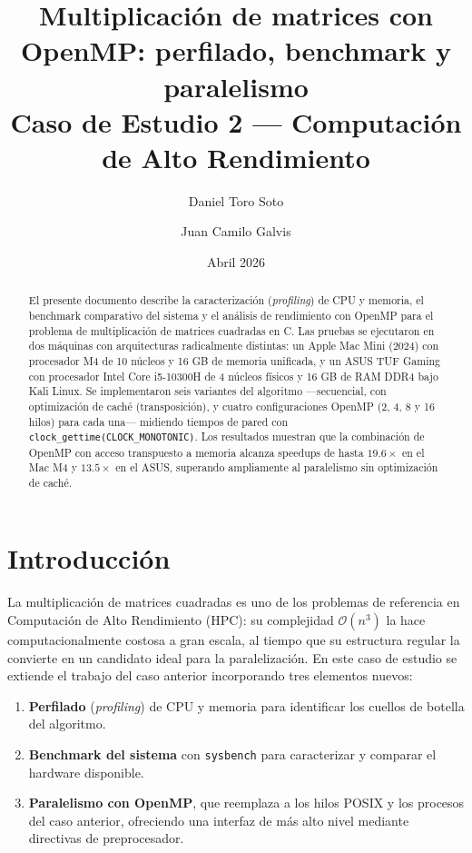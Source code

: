 \documentclass{article}
\title{Multiplicación de matrices con OpenMP: perfilado, benchmark y paralelismo\\[0.5em]
\large Caso de Estudio 2 --- Computación de Alto Rendimiento}
\author{Daniel Toro Soto \and Juan Camilo Galvis}
\date{Abril 2026}
\begin{document}
\maketitle

\begin{abstract}
El presente documento describe la caracterización (\emph{profiling}) de CPU y memoria, el benchmark comparativo del sistema y el análisis de rendimiento con OpenMP para el problema de multiplicación de matrices cuadradas en C. Las pruebas se ejecutaron en dos máquinas con arquitecturas radicalmente distintas: un Apple Mac Mini (2024) con procesador M4 de 10 núcleos y 16 GB de memoria unificada, y un ASUS TUF Gaming con procesador Intel Core i5-10300H de 4 núcleos físicos y 16 GB de RAM DDR4 bajo Kali Linux. Se implementaron seis variantes del algoritmo ---secuencial, con optimización de caché (transposición), y cuatro configuraciones OpenMP (2, 4, 8 y 16 hilos) para cada una--- midiendo tiempos de pared con \texttt{clock\_gettime(CLOCK\_MONOTONIC)}. Los resultados muestran que la combinación de OpenMP con acceso transpuesto a memoria alcanza speedups de hasta $19.6\times$ en el Mac M4 y $13.5\times$ en el ASUS, superando ampliamente al paralelismo sin optimización de caché.
\end{abstract}

\tableofcontents
\newpage

\section{Introducción}

La multiplicación de matrices cuadradas es uno de los problemas de referencia en Computación de Alto Rendimiento (HPC): su complejidad $\mathcal{O}(n^3)$ la hace computacionalmente costosa a gran escala, al tiempo que su estructura regular la convierte en un candidato ideal para la paralelización. En este caso de estudio se extiende el trabajo del caso anterior incorporando tres elementos nuevos:

\begin{enumerate}
    \item \textbf{Perfilado} (\emph{profiling}) de CPU y memoria para identificar los cuellos de botella del algoritmo.
    \item \textbf{Benchmark del sistema} con \texttt{sysbench} para caracterizar y comparar el hardware disponible.
    \item \textbf{Paralelismo con OpenMP}, que reemplaza a los hilos POSIX y los procesos del caso anterior, ofreciendo una interfaz de más alto nivel mediante directivas de preprocesador.
\end{enumerate}
\end{document}
